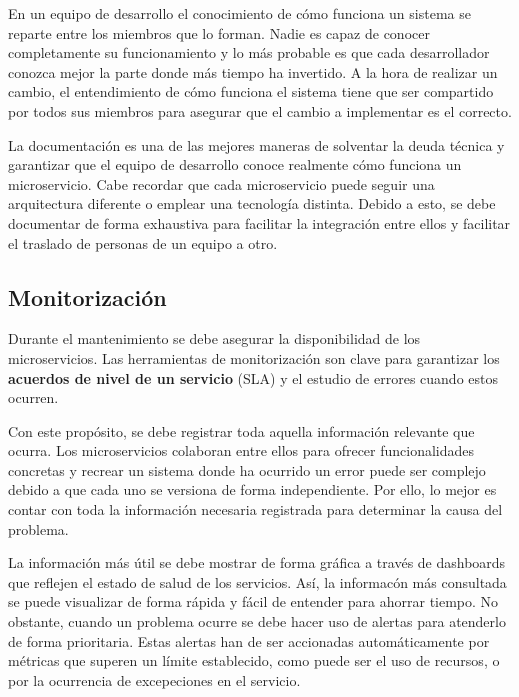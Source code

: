 \documentclass[11pt,spanish,listoffigures]{tfgetsinf}
\begin{document}
En un equipo de desarrollo el conocimiento de cómo funciona un sistema se reparte entre los miembros que lo forman. Nadie es capaz de conocer completamente su funcionamiento y lo más probable es que cada desarrollador conozca mejor la parte donde más tiempo ha invertido. A la hora de realizar un cambio, el entendimiento de cómo funciona el sistema tiene que ser compartido por todos sus miembros para asegurar que el cambio a implementar es el correcto.

La documentación es una de las mejores maneras de solventar la deuda técnica y garantizar que el equipo de desarrollo conoce realmente cómo funciona un microservicio. Cabe recordar que cada microservicio puede seguir una arquitectura diferente o emplear una tecnología distinta. Debido a esto, se debe documentar de forma exhaustiva para facilitar la integración entre ellos y facilitar el traslado de personas de un equipo a otro.

\subsection{Monitorización}

Durante el mantenimiento se debe asegurar la disponibilidad de los microservicios. Las herramientas de monitorización son clave para garantizar los \textbf{acuerdos de nivel de un servicio} (SLA) y el estudio de errores cuando estos ocurren.

Con este propósito, se debe registrar toda aquella información relevante que ocurra. Los microservicios colaboran entre ellos para ofrecer funcionalidades concretas y recrear un sistema donde ha ocurrido un error puede ser complejo debido a que cada uno se versiona de forma independiente. Por ello, lo mejor es contar con toda la información necesaria registrada para determinar la causa del problema.

La información más útil se debe mostrar de forma gráfica a través de dashboards que reflejen el estado de salud de los servicios. Así, la informacón más consultada se puede visualizar de forma rápida y fácil de entender para ahorrar tiempo. No obstante, cuando un problema ocurre se debe hacer uso de alertas para atenderlo de forma prioritaria. Estas alertas han de ser accionadas automáticamente por métricas que superen un límite establecido, como puede ser el uso de recursos, o por la ocurrencia de excepeciones en el servicio. \cite{FowlerSusan}

%
\end{document}
